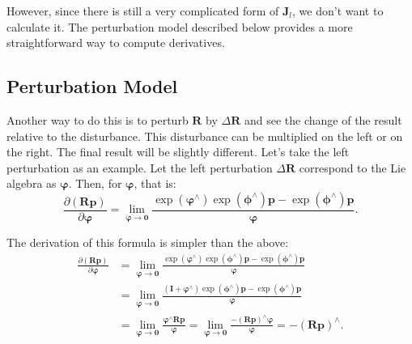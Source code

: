 However, since there is still a very complicated form of $\mathbf{J}_l$, we don't want to calculate it. The perturbation model described below provides a more straightforward way to compute derivatives.

\subsection{Perturbation Model}
Another way to do this is to perturb $\mathbf{R}$ by $\Delta \mathbf{R}$ and see the change of the result relative to the disturbance. This disturbance can be multiplied on the left or on the right. The final result will be slightly different. Let's take the left perturbation as an example. Let the left perturbation $\Delta \mathbf{R}$ correspond to the Lie algebra as $\boldsymbol{\varphi}$. Then, for $\boldsymbol{\varphi}$, that is:
\begin{equation}
\frac{{\partial \left( {\mathbf{Rp}} \right)}}{{\partial \boldsymbol{\varphi} }} = \mathop {\lim }\limits_{\boldsymbol{\varphi}  \to \mathbf{0}} \frac{{\exp \left( {{\boldsymbol{\varphi} ^ \wedge }} \right)\exp \left( {{\boldsymbol{\phi} ^ \wedge }} \right)\mathbf{p} - \exp \left( {{\boldsymbol{\phi} ^ \wedge }} \right)\mathbf{p}}}{\boldsymbol{\varphi} }.
\end{equation}

The derivation of this formula is simpler than the above:
\begin{align*}
\frac{{\partial \left( {\mathbf{Rp}} \right)}}{{\partial \boldsymbol{\varphi} }} &= \mathop {\lim }\limits_{\boldsymbol{\varphi}  \to \mathbf{0}} \frac{{\exp \left( {{\boldsymbol{\varphi} ^ \wedge }} \right)\exp \left( {{\boldsymbol{\phi} ^ \wedge }} \right)\mathbf{p} - \exp \left( {{\boldsymbol{\phi} ^ \wedge }} \right)\mathbf{p}}}{ \boldsymbol{\varphi} }\\
&= \mathop {\lim }\limits_{\boldsymbol{\varphi } \to \mathbf{0}} \frac{{\left( {\mathbf{I} + {\boldsymbol{\varphi }^ \wedge }} \right)\exp \left( {{\boldsymbol{\phi} ^ \wedge }} \right)\mathbf{p} - \exp \left( {{\boldsymbol{\phi} ^ \wedge }} \right)\mathbf{p}}}{\boldsymbol{\varphi} }\\
&= \mathop {\lim }\limits_{\boldsymbol{\varphi}  \to \mathbf{0}} \frac{{{\boldsymbol{\varphi} ^ \wedge }\mathbf{Rp}}}{\boldsymbol{\varphi} } = \mathop {\lim }\limits_{\boldsymbol{\varphi}  \to \mathbf{0}} \frac{{ - {{\left( \mathbf{Rp} \right)}^ \wedge }\boldsymbol{\varphi} }}{\boldsymbol{\varphi} } =  - {\left( \mathbf{Rp} \right)^ \wedge }.
\end{align*}

